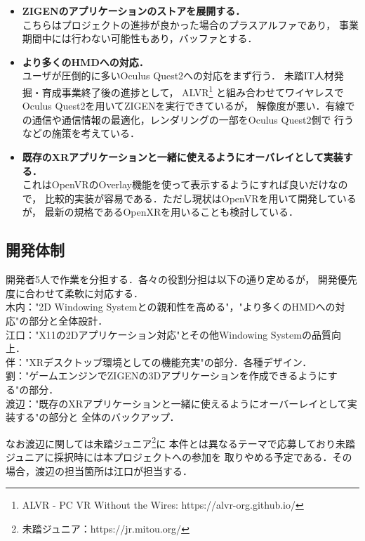 \begin{itemize}
      \item \textbf{ZIGENのアプリケーションのストアを展開する．\\}
            こちらはプロジェクトの進捗が良かった場合のプラスアルファであり，
            事業期間中には行わない可能性もあり，バッファとする．

      \item \textbf{より多くのHMDへの対応．\\}
            ユーザが圧倒的に多いOculus Quest2への対応をまず行う．
            未踏IT人材発掘・育成事業終了後の進捗として，
            ALVR\footnote{ALVR - PC VR Without the Wires: https://alvr-org.github.io/}
            と組み合わせてワイヤレスでOculus Quest2を用いてZIGENを実行できているが，
            解像度が悪い．有線での通信や通信情報の最適化，レンダリングの一部をOculus Quest2側で
            行うなどの施策を考えている．

      \item \textbf{既存のXRアプリケーションと一緒に使えるようにオーバレイとして実装する．\\}
            これはOpenVRのOverlay機能を使って表示するようにすれば良いだけなので，
            比較的実装が容易である．ただし現状はOpenVRを用いて開発しているが，
            最新の規格であるOpenXRを用いることも検討している．
\end{itemize}

\subsection{開発体制}

開発者5人で作業を分担する．各々の役割分担は以下の通り定めるが，
開発優先度に合わせて柔軟に対応する．\\
木内："2D Windowing Systemとの親和性を高める"，"より多くのHMDへの対応"の部分と全体設計．\\
江口："X11の2Dアプリケーション対応"とその他Windowing Systemの品質向上．\\
伴："XRデスクトップ環境としての機能充実"の部分．各種デザイン．\\
劉："ゲームエンジンでZIGENの3Dアプリケーションを作成できるようにする"の部分．\\
渡辺："既存のXRアプリケーションと一緒に使えるようにオーバーレイとして実装する"の部分と
全体のバックアップ．

なお渡辺に関しては未踏ジュニア\footnote{未踏ジュニア：https://jr.mitou.org/}に
本件とは異なるテーマで応募しており未踏ジュニアに採択時には本プロジェクトへの参加を
取りやめる予定である．その場合，渡辺の担当箇所は江口が担当する．

